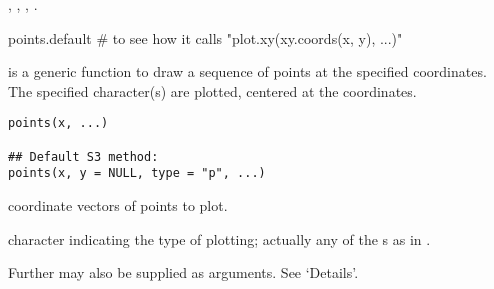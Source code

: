 %
\begin{SeeAlso}\relax
{},
,
,
.
\end{SeeAlso}
%
\begin{Examples}
\begin{ExampleCode}
points.default # to see how it calls "plot.xy(xy.coords(x, y), ...)"
\end{ExampleCode}
\end{Examples}
\graphicspath{{/usr/local/R-2.15.1/library/graphics/help/figures/}}
%
\begin{Description}\relax
{} is a generic function to draw a sequence of points at
the specified coordinates.  The specified character(s) are plotted,
centered at the coordinates.
\end{Description}
%
\begin{Usage}
\begin{verbatim}
points(x, ...)

## Default S3 method:
points(x, y = NULL, type = "p", ...)
\end{verbatim}
\end{Usage}
%
\begin{Arguments}
\begin{ldescription}
\item[\code{x, y}] coordinate vectors of points to plot.
\item[\code{type}] character indicating the type of plotting; actually any of
the s as in .
\item[\code{...}] Further  may also be supplied as
arguments.  See `Details'.
\end{ldescription}
\end{Arguments}
%
